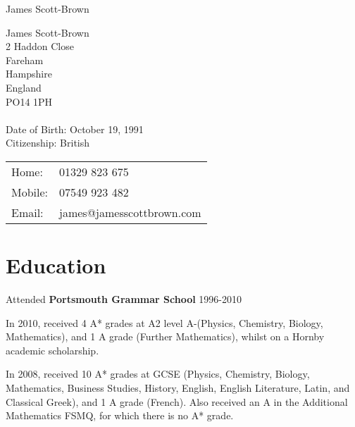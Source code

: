 \documentclass[letterpaper]{article}
\def\name{James Scott-Brown}
\renewenvironment{itemize}{
  \begin{list}{}{
    \setlength{\leftmargin}{1.5em}
  }
}{
  \end{list}
}
\begin{document}
{\huge \name}


\vspace{0.25in}

\begin{minipage}[t]{0.5\textwidth}
James Scott-Brown\\
2 Haddon Close\\
Fareham\\
Hampshire\\
England\\
PO14 1PH\\ \\
Date of Birth: October 19, 1991 \\
Citizenship: British
\end{minipage}
\begin{minipage}[t]{0.5\textwidth}
\begin{tabular}{ll}  
Home: &01329 823 675 \\
Mobile: &07549 923 482\\
Email: &james@jamesscottbrown.com \\
\end{tabular}
\end{minipage}



\section*{Education}
\begin{itemize}
 \item Attended {\bf Portsmouth Grammar School} 1996-2010
 \item In 2010, received 4 A* grades at A2 level A-(Physics, Chemistry, Biology, Mathematics), and 1 A grade (Further Mathematics), whilst on a Hornby academic scholarship.
 \item In 2008, received 10 A* grades at GCSE (Physics, Chemistry, Biology, Mathematics, Business Studies, History, English, English Literature, Latin, and Classical Greek), and 1 A grade (French). Also received an A in the Additional Mathematics FSMQ, for which there is no A* grade.
\end{itemize}
\end{document}
